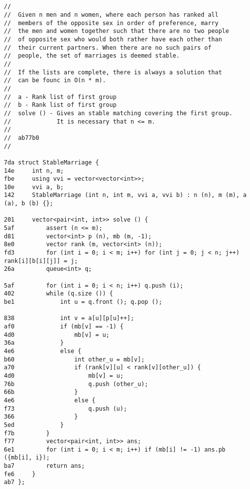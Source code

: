 \documentclass[11pt, a4paper, twoside]{article}
\begin{document}
\subsection{}
\begin{lstlisting}
//
//  Given n men and n women, where each person has ranked all 
//  members of the opposite sex in order of preference, marry 
//  the men and women together such that there are no two people 
//  of opposite sex who would both rather have each other than 
//  their current partners. When there are no such pairs of 
//  people, the set of marriages is deemed stable.
//
//  If the lists are complete, there is always a solution that
//  can be founc in O(n * m).
//
//  a - Rank list of first group
//  b - Rank list of first group
//  solve () - Gives an stable matching covering the first group.
//             It is necessary that n <= m.
//
//  ab77b0
//

7da struct StableMarriage {
14e     int n, m;
fbe     using vvi = vector<vector<int>>;
10e     vvi a, b;
142     StableMarriage (int n, int m, vvi a, vvi b) : n (n), m (m), a (a), b (b) {};
    
201     vector<pair<int, int>> solve () {
5af         assert (n <= m);
d81         vector<int> p (n), mb (m, -1);
8e0         vector rank (m, vector<int> (n));
fd3         for (int i = 0; i < m; i++) for (int j = 0; j < n; j++) rank[i][b[i][j]] = j;
26a         queue<int> q;
    
5af         for (int i = 0; i < n; i++) q.push (i);
402         while (q.size ()) {
be1             int u = q.front (); q.pop ();
    
838             int v = a[u][p[u]++];
af0             if (mb[v] == -1) {
4d0                 mb[v] = u;
36a             }
4e6             else {
b60                 int other_u = mb[v];
a70                 if (rank[v][u] < rank[v][other_u]) {
4d0                     mb[v] = u;
76b                     q.push (other_u);
66b                 }
4e6                 else {
f73                     q.push (u);
366                 }
5ed             }
f7b         }
f77         vector<pair<int, int>> ans;
6e1         for (int i = 0; i < m; i++) if (mb[i] != -1) ans.pb ({mb[i], i});
ba7         return ans;
fe6     }
ab7 };
\end{lstlisting}
\end{document}
